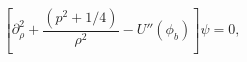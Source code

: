 \begin{equation}\left[\partial_{\rho}^2+\frac{(p^2+1/4)}{\rho^2}-U''(\phi_{b})\right]\psi=0,\end{equation}

